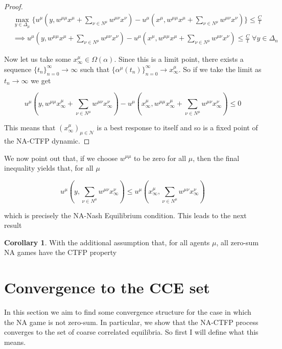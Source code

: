 \documentclass{article}
\theoremstyle{definition}
\newtheorem{corollary}{Corollary}
\newcommand{\agentset}{\mathcal{N}}
\newcommand{\wmunu}{w^{\mu \nu}}
\newcommand{\xmu}{x^{\mu}}
\newcommand{\xnu}{x^{\nu}}
\begin{document}
\begin{proof}
		\begin{align}
			& \max_{y \in \Delta_\mu} \{u^\mu(y, w^{\mu \mu} \xmu + \sum_{\nu \in N^\mu} \wmunu \xnu) - u^\mu(\xmu, w^{\mu \mu} \xmu + \sum_{\nu \in N^\mu} \wmunu \xnu) \} \leq \frac{C}{t}\\
			& \implies u^\mu(y, w^{\mu \mu} \xmu + \sum_{\nu \in N^\mu} \wmunu \xnu) - u^\mu(\xmu, w^{\mu \mu} \xmu + \sum_{\nu \in N^\mu} \wmunu \xnu) \leq \frac{C}{t} \; \forall y \in \Delta_n
		\end{align}
		
		Now let us take some $\xmu_\infty \in \Omega(\alpha)$. Since this is a limit point, there exists a sequence $\{t_n\}_{n = 0}^\infty \rightarrow \infty$ such that $\{\alpha^\mu(t_n)\}_{n = 0}^{\infty} \rightarrow \xmu_\infty$. So if we take the limit as $t_n \rightarrow \infty$ we get

		\begin{equation}
			u^\mu(y, w^{\mu \mu} \xmu_\infty + \sum_{\nu \in N^\mu} \wmunu \xnu_\infty) - u^\mu(\xmu_\infty, w^{\mu \mu} \xmu_\infty + \sum_{\nu \in N^\mu} \wmunu \xnu_\infty) \leq 0
		\end{equation}

		This means that $(\xmu_\infty)_{\mu \in \agentset}$ is a best response to itself and so is a fixed point of the NA-CTFP dynamic. 
	\end{proof}

	We now point out that, if we choose $w^{\mu \mu}$ to be zero for all $\mu$, then the final inequality yields that, for all $\mu$

	\begin{equation}
		u^\mu(y, \sum_{\nu \in N^\mu} \wmunu \xnu_\infty) \leq u^\mu(\xmu_\infty, \sum_{\nu \in N^\mu} \wmunu \xnu_\infty)
	\end{equation}

	which is precisely the NA-Nash Equilibrium condition. This leads to the next result

	\begin{corollary}
		With the additional assumption that, for all agents $\mu$, all zero-sum NA games have the CTFP property
	\end{corollary}

	\section{Convergence to the CCE set}

	In this section we aim to find some convergence structure for the case in which the NA game is not zero-sum. In particular, we  show that the NA-CTFP process converges to the set of coarse correlated equilibria. So first I will define what this means.
\end{document}
